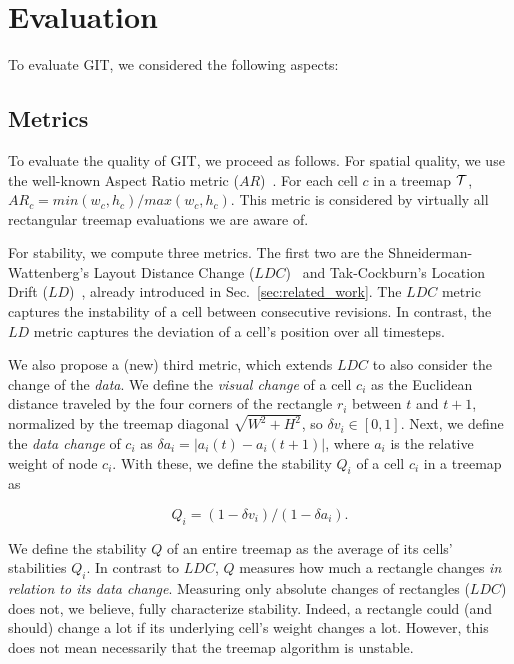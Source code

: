 \section{Evaluation}
\label{sec:evaluation}
%
To evaluate GIT, we considered the following aspects:

\subsection{Metrics}
\label{sec:eval_metrics}
%
To evaluate the quality of GIT, we proceed as follows. For spatial quality, we use the well-known Aspect Ratio metric ($AR$)~\citep{sqr}. For each cell $c$ in a treemap ${\cal T}$, $AR_c = min(w_c, h_c)/max(w_c, h_c)$. This metric is considered by virtually all rectangular treemap evaluations we are aware of.

For stability, we compute three metrics. The first two are the Shneiderman-Wattenberg's Layout Distance Change ($LDC$)~\citep{ordered} and Tak-Cockburn's Location Drift ($LD$)~\citep{hilbert_moore}, already introduced in
Sec.~\ref{sec:related_work}. The $LDC$ metric captures the instability of a cell between consecutive revisions. In contrast, the $LD$ metric captures the deviation of a cell's position over all timesteps.

We also propose a (new) third metric, which extends $LDC$ to also consider the change of the \emph{data}. We define the \emph{visual change} of a cell $c_i$ as the Euclidean distance traveled by the four corners of the rectangle $r_i$ between $t$ and $t+1$, normalized by the treemap diagonal $\sqrt{W^2+H^2}$, so $\delta v_i \in [0,1]$. Next, we define the \emph{data change} of $c_i$ as $\delta a_i = |a_i(t)-a_i(t+1)|$, where $a_i$ is the relative weight of node $c_i$. With these, we define the stability $Q_i$ of a cell $c_i$ in a treemap as

\begin{equation}
Q_i =  (1-\delta v_i) / (1 - \delta a_i).
\label{eqn:stab_ratio}
\end{equation}

We define the stability $Q$ of an entire treemap as the average of its cells' stabilities $Q_i$. In contrast to $LDC$, $Q$ measures how much a rectangle changes \emph{in relation to its data change}. Measuring only absolute changes of rectangles ($LDC$) does not, we believe, fully characterize stability. Indeed, a rectangle could (and should) change a lot if its underlying cell's weight changes a lot. However, this does not mean necessarily that the treemap algorithm is unstable.

